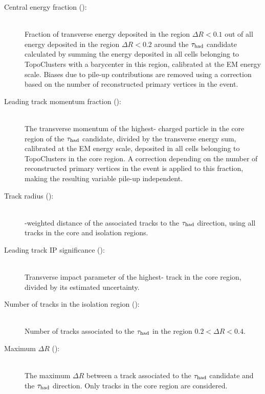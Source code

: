 \begin{description}

    \item[Central energy fraction (\centEnergyFrac{}):] \hfill \\ 
      Fraction of transverse energy deposited in the region $\Delta R < 0.1$ out of all energy deposited in the region $\Delta R < 0.2$ around the $\tau_\text{had}$ candidate calculated by summing the energy deposited in all cells belonging to TopoClusters with a barycenter in this region, calibrated at the EM energy scale. Biases due to pile-up contributions are removed using a correction based on the number of reconstructed primary vertices in the event.

    \item[Leading track momentum fraction (\leadTrackMomFrac{}):] \hfill \\ 
      The transverse momentum of the highest-\pt{} charged particle in the core region of the $\tau_\text{had}$ candidate, divided by the transverse energy sum, calibrated at the EM energy scale, deposited in all cells belonging to TopoClusters in the core region. A correction depending on the number of reconstructed primary vertices in the event is applied to this fraction, making the resulting variable pile-up independent.

    \item[Track radius (\trackRadius{}):] \hfill \\ 
      \pt-weighted distance of the associated tracks to the $\tau_\text{had}$ direction, using all tracks in the core and isolation regions.

    \item[Leading track IP significance (\ipSigLeadTrk{}): ] \hfill \\ 
      Transverse impact parameter of the  highest-\pt{} track in the core region, divided by its estimated uncertainty.

    \item[Number of tracks in the isolation region (\numIsoTrack{}):] \hfill \\ 
      Number of tracks associated to the $\tau_\text{had}$ in the region $0.2<\Delta R<0.4$.
      
    \item[Maximum $\Delta R$ (\dRmax{}): ] \hfill \\ 
      The maximum $\Delta R$ between a track associated to the $\tau_\text{had}$ candidate and the $\tau_\text{had}$ direction. Only tracks in the core region are considered.
      

\end{description}
